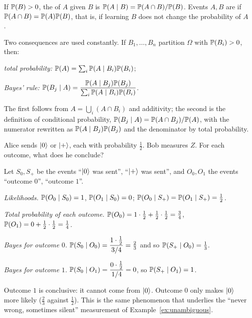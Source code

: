 \begin{definition}\label{def:conditional}
  If $\mathbb{P}(B)>0$, the  of $A$ given $B$ is $\mathbb{P}(A\mid B)=\mathbb{P}(A\cap B)/\mathbb{P}(B)$. Events $A,B$ are  if $\mathbb{P}(A\cap B)=\mathbb{P}(A)\mathbb{P}(B)$, that is, if learning $B$ does not change the probability of $A$.
\end{definition}

Two consequences are used constantly. If $B_1,\dots,B_n$ partition $\Omega$ with $\mathbb{P}(B_i)>0$, then:
\begin{steps}
  \item \emph{total probability:} $\mathbb{P}(A)=\sum_i\mathbb{P}(A\mid B_i)\mathbb{P}(B_i)$;
  \item \emph{Bayes' rule:} $\mathbb{P}(B_j\mid A)=\dfrac{\mathbb{P}(A\mid B_j)\mathbb{P}(B_j)}{\sum_i\mathbb{P}(A\mid B_i)\mathbb{P}(B_i)}$.
\end{steps}
The first follows from $A=\bigcup_i(A\cap B_i)$ and additivity; the second is the definition of conditional probability, $\mathbb{P}(B_j\mid A)=\mathbb{P}(A\cap B_j)/\mathbb{P}(A)$, with the numerator rewritten as $\mathbb{P}(A\mid B_j)\mathbb{P}(B_j)$ and the denominator by total probability.

\begin{example}\label{ex:bayes}
  Alice sends $\left|0\right\rangle$ or $\left|+\right\rangle$, each with probability $\tfrac12$. Bob measures $Z$. For each outcome, what does he conclude?
\end{example}
\begin{solution}
  Let $S_0,S_+$ be the events ``$\left|0\right\rangle$ was sent'', ``$\left|+\right\rangle$ was sent'', and $O_0,O_1$ the events ``outcome $0$'', ``outcome $1$''.
  \begin{steps}
    \item \emph{Likelihoods.} $\mathbb{P}(O_0\mid S_0)=1$, $\mathbb{P}(O_1\mid S_0)=0$; $\mathbb{P}(O_0\mid S_+)=\mathbb{P}(O_1\mid S_+)=\tfrac12$.
    \item \emph{Total probability of each outcome.} $\mathbb{P}(O_0)=1\cdot\tfrac12+\tfrac12\cdot\tfrac12=\tfrac34$, $\mathbb{P}(O_1)=0+\tfrac12\cdot\tfrac12=\tfrac14$.
    \item \emph{Bayes for outcome $0$.} $\mathbb{P}(S_0\mid O_0)=\dfrac{1\cdot\frac12}{3/4}=\tfrac23$ and so $\mathbb{P}(S_+\mid O_0)=\tfrac13$.
    \item \emph{Bayes for outcome $1$.} $\mathbb{P}(S_0\mid O_1)=\dfrac{0\cdot\frac12}{1/4}=0$, so $\mathbb{P}(S_+\mid O_1)=1$.
  \end{steps}
  Outcome $1$ is conclusive: it cannot come from $\left|0\right\rangle$. Outcome $0$ only makes $\left|0\right\rangle$ more likely ($\tfrac23$ against $\tfrac12$). This is the same phenomenon that underlies the ``never wrong, sometimes silent'' measurement of Example~\ref{ex:unambiguous}.
\end{solution}

